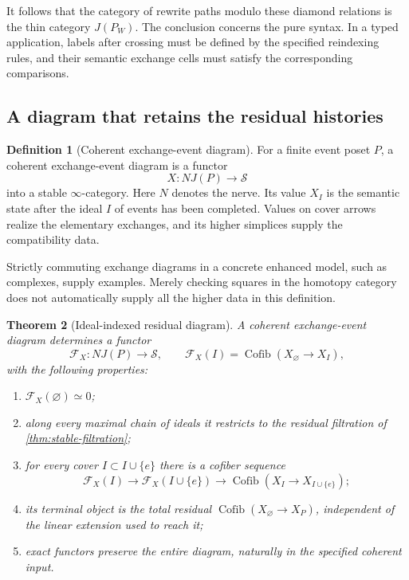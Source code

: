 \documentclass[11pt]{article}
\newtheorem{theorem}{Theorem}[section]
\theoremstyle{definition}
\newtheorem{definition}[theorem]{Definition}
\theoremstyle{remark}
\newcommand{\Cofib}{\operatorname{Cofib}}
\begin{document}
It follows that the category of rewrite paths modulo these diamond relations is the thin category $J(P_W)$. The conclusion concerns the pure syntax. In a typed application, labels after crossing must be defined by the specified reindexing rules, and their semantic exchange cells must satisfy the corresponding comparisons.

\subsection{A diagram that retains the residual histories}

\begin{definition}[Coherent exchange-event diagram]
For a finite event poset $P$, a coherent exchange-event diagram is a functor
\[
X:NJ(P)\longrightarrow\mathcal S
\]
into a stable $\infty$-category. Here $N$ denotes the nerve. Its value $X_I$ is the semantic state after the ideal $I$ of events has been completed. Values on cover arrows realize the elementary exchanges, and its higher simplices supply the compatibility data.
\end{definition}

Strictly commuting exchange diagrams in a concrete enhanced model, such as complexes, supply examples. Merely checking squares in the homotopy category does not automatically supply all the higher data in this definition.

\begin{theorem}[Ideal-indexed residual diagram]\label{thm:ideal-residual}
A coherent exchange-event diagram determines a functor
\[
\mathcal F_X:NJ(P)\longrightarrow\mathcal S,
\qquad
\mathcal F_X(I)=\Cofib(X_{\varnothing}\longrightarrow X_I),
\]
with the following properties:
\begin{enumerate}
\item $\mathcal F_X(\varnothing)\simeq0$;
\item along every maximal chain of ideals it restricts to the residual filtration of \cref{thm:stable-filtration};
\item for every cover $I\subset I\cup\{e\}$ there is a cofiber sequence
\[
\mathcal F_X(I)\longrightarrow\mathcal F_X(I\cup\{e\})
\longrightarrow\Cofib(X_I\to X_{I\cup\{e\}});
\]
\item its terminal object is the total residual $\Cofib(X_{\varnothing}\to X_P)$, independent of the linear extension used to reach it;
\item exact functors preserve the entire diagram, naturally in the specified coherent input.
\end{enumerate}
\end{theorem}
\end{document}
